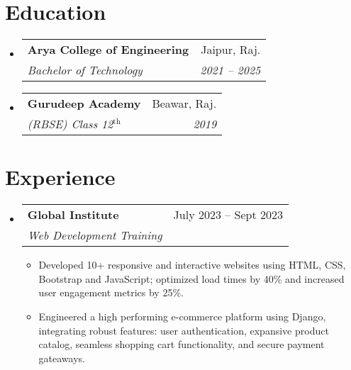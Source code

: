 \documentclass[letterpaper,11pt]{article}
\makeatletter
\newcommand{\resumeItem}[1]{
  \item\small{
    {#1 \vspace{-2pt}}
  }
}
\newcommand{\resumeSubheading}[4]{
  \vspace{-2pt}\item
    \begin{tabular*}{0.97\textwidth}[t]{l@{\extracolsep{\fill}}r}
      \textbf{#1} & #2 \\
      \textit{\small#3} & \textit{\small #4} \\
    \end{tabular*}\vspace{-7pt}
}
\newcommand{\resumeSubSubheading}[2]{
    \item
    \begin{tabular*}{0.97\textwidth}{l@{\extracolsep{\fill}}r}
      \textit{\small#1} & \textit{\small #2} \\
    \end{tabular*}\vspace{-7pt}
}
\newcommand{\resumeSubHeadingListStart}{\begin{itemize}[leftmargin=0.15in, label={}]}
\newcommand{\resumeSubHeadingListEnd}{\end{itemize}}
\newcommand{\resumeItemListStart}{\begin{itemize}}
\newcommand{\resumeItemListEnd}{\end{itemize}\vspace{-5pt}}
\makeatother
\begin{document}
\section{Education}
  \resumeSubHeadingListStart
    \resumeSubheading
      {Arya College of Engineering}{Jaipur, Raj.}
      {Bachelor of Technology}{2021 -- 2025}
    \resumeSubheading
      {Gurudeep Academy}{Beawar, Raj.}
      {(RBSE) Class 12$^{\text{th}}$}{2019}
  \resumeSubHeadingListEnd


\section{Experience}
  \resumeSubHeadingListStart

    \resumeSubheading
      {Global Institute}{July 2023 -- Sept 2023}
      {Web Development Training}{}
      \resumeItemListStart
        \resumeItem{Developed 10+ responsive and interactive websites using HTML, CSS, Bootstrap and JavaScript; optimized load times by 40\% and increased user engagement metrics by 25\%.}
        \resumeItem{Engineered a high performing e-commerce platform using Django, integrating robust features: user authentication, expansive product catalog, seamless shopping cart functionality, and secure payment gateaways.}
      \resumeItemListEnd
      

  \resumeSubHeadingListEnd


\end{document}
